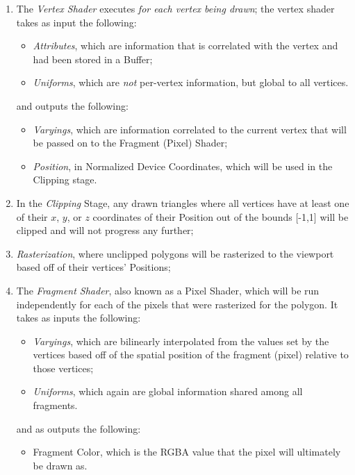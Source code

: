 \begin{enumerate}
    \item The \emph{Vertex Shader} executes \emph{for each vertex being drawn}; the vertex shader takes as input the following:
    \begin{itemize}
        \item \emph{Attributes}, which are information that is correlated with the vertex and had been stored in a Buffer;
        \item \emph{Uniforms}, which are \emph{not} per-vertex information, but global to all vertices.
    \end{itemize}
    and outputs the following:
    \begin{itemize}
        \item \emph{Varyings}, which are information correlated to the current vertex that will be passed on to the Fragment (Pixel) Shader;
        \item \emph{Position}, in Normalized Device Coordinates, which will be used in the Clipping stage.
    \end{itemize}
    \item In the \emph{Clipping} Stage, any drawn triangles where all vertices have at least one of their $x$, $y$, or $z$ coordinates of their Position out of the bounds [-1,1] will be clipped and will not progress any further;
    \item \emph{Rasterization}, where unclipped polygons will be rasterized to the viewport based off of their vertices' Positions;
    \item The \emph{Fragment Shader}, also known as a Pixel Shader, which will be run independently for each of the pixels that were rasterized for the polygon. It takes as inputs the following:
    \begin{itemize}
        \item \emph{Varyings}, which are bilinearly interpolated from the values set by the vertices based off of the spatial position of the fragment (pixel) relative to those vertices;
        \item \emph{Uniforms}, which again are global information shared among all fragments.
    \end{itemize}
    and as outputs the following:
    \begin{itemize}
        \item Fragment Color, which is the RGBA value that the pixel will ultimately be drawn as.
    \end{itemize}
\end{enumerate}


